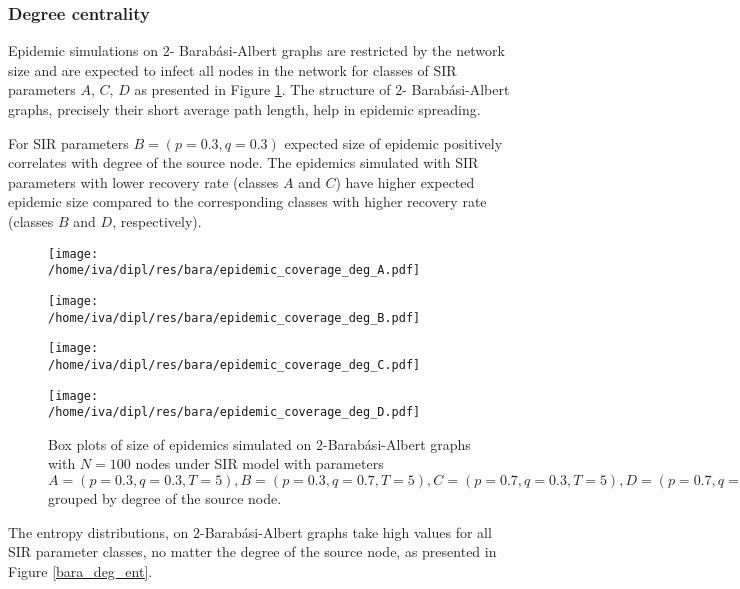 \documentclass[times, utf8, diplomski]{fer}
\begin{document}
\subsubsection{Degree centrality}

Epidemic simulations on  $2$- Barab\'{a}si-Albert graphs are restricted by the network size and are expected to infect all nodes in the network for classes of SIR parameters $A$, $C$, $D$ as presented in Figure \ref{bara_cov}. The structure of $2$- Barab\'{a}si-Albert graphs, precisely their short average path length, help in epidemic spreading. 

 For SIR parameters $B = (p = 0.3, q = 0.3)$ expected size of epidemic positively correlates with degree of the source node. The epidemics simulated with SIR parameters with lower recovery rate  (classes $A$ and $C$) have higher expected epidemic size  compared to the corresponding classes with higher recovery rate (classes $B$ and $D$, respectively).
  
\begin{figure}[H]
\begin{minipage}{0.47\textwidth}
\center
\texttt{[image: /home/iva/dipl/res/bara/epidemic\_coverage\_deg\_A.pdf]}
\end{minipage}
\begin{minipage}{0.47\textwidth}
\center
\texttt{[image: /home/iva/dipl/res/bara/epidemic\_coverage\_deg\_B.pdf]}
\end{minipage}

\begin{minipage}{0.47\textwidth}
\center
\texttt{[image: /home/iva/dipl/res/bara/epidemic\_coverage\_deg\_C.pdf]}
\end{minipage}
\begin{minipage}{0.47\textwidth}
\center
\texttt{[image: /home/iva/dipl/res/bara/epidemic\_coverage\_deg\_D.pdf]}
\end{minipage}
\caption{Box plots of size of epidemics simulated on  $2$-Barab\'{a}si-Albert graphs  with $N=100$ nodes under SIR model with parameters $A = (p=0.3, q=0.3, T=5), B = (p=0.3, q=0.7, T=5), C = (p=0.7, q=0.3, T=5), D = (p=0.7, q=0.7, T=5)$ grouped by degree of the source node.}
\label{bara_cov}
\end{figure}

The entropy distributions,  on  $2$-Barab\'{a}si-Albert graphs take high values for all SIR parameter classes, no matter the degree of the source node, as presented in Figure \ref{bara_deg_ent}.
\end{document}

